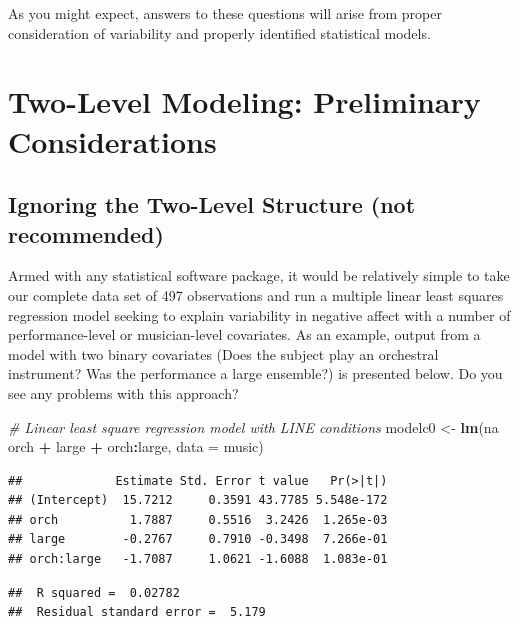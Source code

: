 \documentclass[
]{krantz}
\newenvironment{Shaded}{\begin{snugshade}}{\end{snugshade}}
\newcommand{\CommentTok}[1]{\textcolor[rgb]{0.37,0.37,0.37}{\textit{#1}}}
\newcommand{\DataTypeTok}[1]{\textcolor[rgb]{0.27,0.27,0.27}{#1}}
\newcommand{\KeywordTok}[1]{\textcolor[rgb]{0.27,0.27,0.27}{\textbf{#1}}}
\newcommand{\NormalTok}[1]{#1}
\newcommand{\OperatorTok}[1]{\textcolor[rgb]{0.43,0.43,0.43}{\textbf{#1}}}
\newcommand{\StringTok}[1]{\textcolor[rgb]{0.5,0.5,0.5}{#1}}
\begin{document}
As you might expect, answers to these questions will arise from proper consideration of variability and properly identified statistical models.

\hypertarget{twolevelmodeling}{%
\section{Two-Level Modeling: Preliminary Considerations}\label{twolevelmodeling}}

\hypertarget{multregr}{%
\subsection{Ignoring the Two-Level Structure (not recommended)}\label{multregr}}

Armed with any statistical software package, it would be relatively simple to take our complete data set of 497 observations and run a multiple linear least squares regression model seeking to explain variability in negative affect with a number of performance-level or musician-level covariates. As an example, output from a model with two binary covariates (Does the subject play an orchestral instrument? Was the performance a large ensemble?) is presented below. Do you see any problems with this approach?

\begin{Shaded}
\begin{Highlighting}[]
\CommentTok{# Linear least square regression model with LINE conditions}
\NormalTok{modelc0 <-}\StringTok{ }\KeywordTok{lm}\NormalTok{(na }\OperatorTok{~}\StringTok{ }\NormalTok{orch }\OperatorTok{+}\StringTok{ }\NormalTok{large }\OperatorTok{+}\StringTok{ }\NormalTok{orch}\OperatorTok{:}\NormalTok{large, }\DataTypeTok{data =}\NormalTok{ music)}
\end{Highlighting}
\end{Shaded}

\begin{verbatim}
##             Estimate Std. Error t value   Pr(>|t|)
## (Intercept)  15.7212     0.3591 43.7785 5.548e-172
## orch          1.7887     0.5516  3.2426  1.265e-03
## large        -0.2767     0.7910 -0.3498  7.266e-01
## orch:large   -1.7087     1.0621 -1.6088  1.083e-01
\end{verbatim}

\begin{verbatim}
##  R squared =  0.02782 
##  Residual standard error =  5.179
\end{verbatim}
\end{document}
